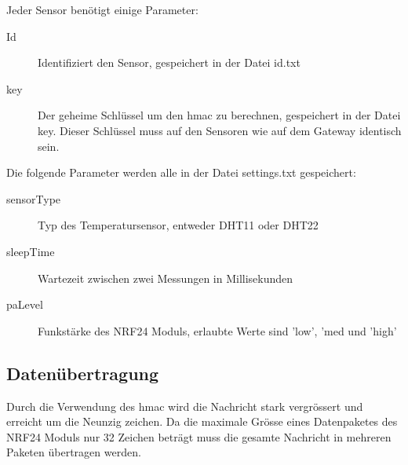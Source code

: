 \documentclass[
  12pt, %
  a4paper, %
  twoside, %
  openany, %
  numbers=noenddot, %
  BCOR=5mm, %
  parskip=half*, %
  thesis, %
]{bfhbook}
\begin{document}
 Jeder Sensor benötigt einige Parameter:
 \begin{description}
\item[Id] Identifiziert den Sensor, gespeichert in der Datei id.txt
\item[key] Der geheime Schlüssel um den \Gls{hmac} zu berechnen, gespeichert in der Datei key. Dieser Schlüssel muss auf den Sensoren wie auf dem Gateway identisch sein.
\end{description}
Die folgende Parameter werden alle in der Datei settings.txt gespeichert:
 \begin{description}
\item[sensorType] Typ des Temperatursensor, entweder DHT11 oder DHT22
\item[sleepTime] Wartezeit zwischen zwei Messungen in Millisekunden
\item[paLevel] Funkstärke des NRF24 Moduls, erlaubte Werte sind 'low', 'med und 'high'
\end{description}

\subsection{Datenübertragung}Durch die Verwendung des \Gls{hmac} wird die Nachricht stark vergrössert und erreicht um die Neunzig zeichen.
Da die maximale Grösse eines Datenpaketes des NRF24 Moduls nur 32 Zeichen beträgt muss die gesamte Nachricht in mehreren Paketen übertragen werden.
\end{document}
